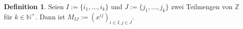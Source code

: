 \documentclass{article}
\theoremstyle{definition}
\newtheorem{definition}{Definition}
\begin{document}
\begin{definition}
    Seien $I := \{i_1,\dots, i_k\}$ und $J := \{j_1,\dots, j_k\}$ zwei Teilmengen von $\mathbb{Z}$ für $k \in \mathbb{N}^+$. Dann ist $M_{IJ} := (x^{ij})_{i \in I, j \in J}$. 
\end{definition}




\end{document}
